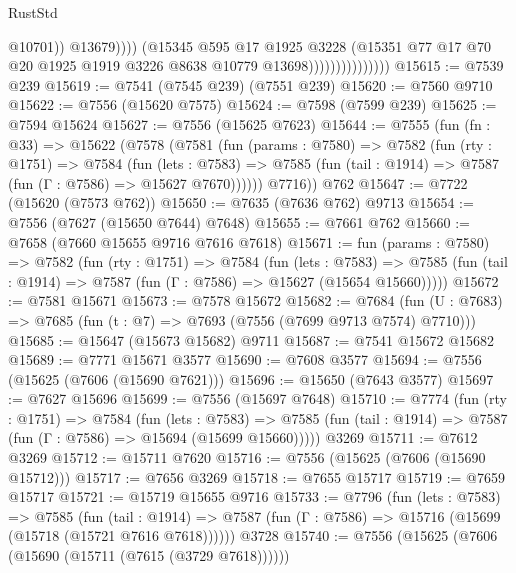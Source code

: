 \begin{lexlean}{RustStd}
\begin{coremodule}
{\begin{coremodule}
{{{{{{{{{{{{{{{{{{{{{{{{{{{{{{{{{{{{{{{{{{{                                          @10701))
                                      @13679))))
                              (@15345
                                @595
                                @17
                                @1925
                                @3228
                                (@15351
                                  @77
                                  @17
                                  @70
                                  @20
                                  @1925
                                  @1919
                                  @3226
                                  @8638
                                  @10779
                                  @13698)))))))))))))))
@15615 := @7539 @239
@15619 := @7541 (@7545 @239) (@7551 @239)
@15620 := @7560 @9710
@15622 := @7556 (@15620 @7575)
@15624 := @7598 (@7599 @239)
@15625 := @7594 @15624
@15627 := @7556 (@15625 @7623)
@15644 := @7555
    (fun (fn : @33) =>
    @15622
      (@7578
        (@7581
          (fun (params : @7580) =>
          @7582
            (fun (rty : @1751) =>
            @7584
              (fun (lets : @7583) =>
              @7585 (fun (tail : @1914) => @7587 (fun (Γ : @7586) => @15627 @7670))))))
        @7716))
    @762
@15647 := @7722 (@15620 (@7573 @762))
@15650 := @7635 (@7636 @762) @9713
@15654 := @7556 (@7627 (@15650 @7644) @7648)
@15655 := @7661 @762
@15660 := @7658 (@7660 @15655 @9716 @7616 @7618)
@15671 := fun (params : @7580) =>
  @7582
    (fun (rty : @1751) =>
    @7584
      (fun (lets : @7583) =>
      @7585 (fun (tail : @1914) => @7587 (fun (Γ : @7586) => @15627 (@15654 @15660)))))
@15672 := @7581 @15671
@15673 := @7578 @15672
@15682 := @7684 (fun (U : @7683) => @7685 (fun (t : @7) => @7693 (@7556 (@7699 @9713 @7574) @7710)))
@15685 := @15647 (@15673 @15682) @9711
@15687 := @7541 @15672 @15682
@15689 := @7771 @15671 @3577
@15690 := @7608 @3577
@15694 := @7556 (@15625 (@7606 (@15690 @7621)))
@15696 := @15650 (@7643 @3577)
@15697 := @7627 @15696
@15699 := @7556 (@15697 @7648)
@15710 := @7774
    (fun (rty : @1751) =>
    @7584
      (fun (lets : @7583) =>
      @7585 (fun (tail : @1914) => @7587 (fun (Γ : @7586) => @15694 (@15699 @15660)))))
    @3269
@15711 := @7612 @3269
@15712 := @15711 @7620
@15716 := @7556 (@15625 (@7606 (@15690 @15712)))
@15717 := @7656 @3269
@15718 := @7655 @15717
@15719 := @7659 @15717
@15721 := @15719 @15655 @9716
@15733 := @7796
    (fun (lets : @7583) =>
    @7585
      (fun (tail : @1914) =>
      @7587 (fun (Γ : @7586) => @15716 (@15699 (@15718 (@15721 @7616 @7618))))))
    @3728
@15740 := @7556 (@15625 (@7606 (@15690 (@15711 (@7615 (@3729 @7618))))))
}}}}}}}}}}}}}}}}}}}}}}}}}}}}}}}}}}}}}}}}}}}
\end{coremodule}}
\end{coremodule}
\end{lexlean}
